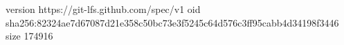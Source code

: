 version https://git-lfs.github.com/spec/v1
oid sha256:82324ae7d67087d21e358c50bc73e3f5245c64d576c3ff95cabb4d34198f3446
size 174916
